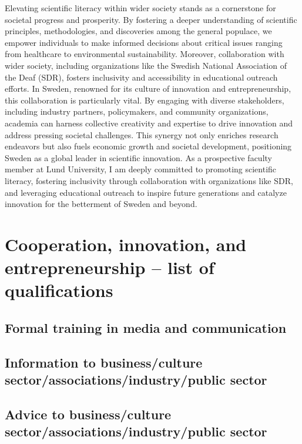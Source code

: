 Elevating scientific literacy within wider society stands as a cornerstone for societal progress and prosperity. By fostering a deeper understanding of scientific principles, methodologies, and discoveries among the general populace, we empower individuals to make informed decisions about critical issues ranging from healthcare to environmental sustainability. Moreover, collaboration with wider society, including organizations like the Swedish National Association of the Deaf (SDR), fosters inclusivity and accessibility in educational outreach efforts. In Sweden, renowned for its culture of innovation and entrepreneurship, this collaboration is particularly vital. By engaging with diverse stakeholders, including industry partners, policymakers, and community organizations, academia can harness collective creativity and expertise to drive innovation and address pressing societal challenges. This synergy not only enriches research endeavors but also fuels economic growth and societal development, positioning Sweden as a global leader in scientific innovation. As a prospective faculty member at Lund University, I am deeply committed to promoting scientific literacy, fostering inclusivity through collaboration with organizations like SDR, and leveraging educational outreach to inspire future generations and catalyze innovation for the betterment of Sweden and beyond.

\section{Cooperation, innovation, and entrepreneurship – list of qualifications} \label{sec:cooperation-innovation-and-entrepreneurship-list-of-qualifications}

\subsection{Formal training in media and communication \none} \label{ssec:formal-training-in-media-and-communication-none}
\subsection{Information to business/culture sector/associations/industry/public sector \noneyet} \label{ssec:information-to-business-culture-sector-associations-industry-public-sector-noneyet}
\subsection{Advice to business/culture sector/associations/industry/public sector} \label{ssec:advice-to-business-culture-sector-associations-industry-public-sector}

